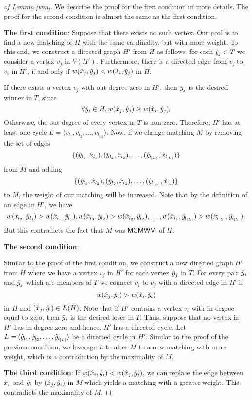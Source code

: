 \begin{proof}[of Lemma \ref{wm}] We describe the proof for the first condition in more details. The proof for the second condition is almost the same as the first condition. 

\textbf{The first condition}: Suppose that there exists no such vertex. Our goal is to find a new matching of $H$ with the same cardinality, but with more weight. To this end, we construct a directed graph $H'$ from $H$ as follows: for each $\hat{y}_j \in T$ we consider a vertex $v_j$ in $V(H')$. Furthermore, there is a directed edge from $v_j$ to $v_i$ in $H'$, if and only if $w(\hat{x}_j,\hat{y}_{j}) < w(\hat{x}_i,\hat{y}_j)$ in $H$. 

If there exists a vertex $v_j$ with out-degree zero in $H'$, then $\hat{y}_j$ is the desired winner in $T$, since
$$ \forall \hat{y}_i \in H, w(\hat{x}_j,\hat{y}_{j}) \geq w(\hat{x}_i,\hat{y}_j).$$
 Otherwise, the out-degree of every vertex in $T$ is non-zero. Therefore, $H'$ has at least one cycle $L = \langle v_{l_1}, v_{l_2}, \ldots, v_{l_{|L|}}\rangle$. Now, if we change matching $M$ by removing the set of edges $$ \{(\hat{y}_{l_1},\hat{x}_{l_1}), (\hat{y}_{l_2},\hat{x}_{l_2}), \ldots, (\hat{y}_{l_{|L|}},\hat{x}_{l_{|L|}})\} $$
from $M$ and adding 
$$\{(\hat{y}_{l_1},\hat{x}_{l_2}), (\hat{y}_{l_2},\hat{x}_{l_3}),\ldots,(\hat{y}_{l_{|L|}},\hat{x}_{l_1})\}$$ 
to $M$, the weight of our matching will be increased. Note that by the definition of an edge in $H'$, we have $$w(\hat{x}_{l_2}, \hat{y}_{l_1}) > w(\hat{x}_{l_1}, \hat{y}_{l_1}),w(\hat{x}_{l_3}, \hat{y}_{l_2}) > w(\hat{x}_{l_2}, \hat{y}_{l_2}),\ldots,w(\hat{x}_{l_1}, \hat{y}_{l_{|L|}}) > w(\hat{x}_{l_{|L|}}, \hat{y}_{l_{|L|}}).$$ But this contradicts the fact that  $M$ was $\textsf{MCMWM}$ of $H$.


\textbf{The second condition}:
\begin{comment}
The proof of this part is very similar to the proof of the first condition. For the sake of contradiction suppose that for every vertex $\vtwo_j \in T$, there is at least one vertex $\vtwo_i \in T$ where $w(\vone_j,\vtwo_{i}) > w(\vone_i,\vtwo_i)$ in $H$ with $(\vone_j,\vtwo_i) \in E(H)$.
\end{comment}
Similar to the proof of the first condition, we construct a new directed graph $H'$ from $H$ where we have a vertex $v_j$ in $H'$ for each vertex $\hat{y}_j$ in $T$. For every pair $\hat{y}_i$ and $\hat{y}_j$ which are members of $T$ we connect $v_i$ to $v_j$ with a directed edge in $H'$ if 
$$w(\hat{x}_j,\hat{y}_{i}) > w(\hat{x}_i,\hat{y}_i)$$ in $H$ and $(\hat{x}_j,\hat{y}_i) \in E(H)$. Note that if $H'$ contains a vertex $v_i$ with in-degree equal to zero, then $\hat{y}_i$ is the desired loser in $T$. Thus, suppose that no vertex in $H'$ has in-degree zero and hence, $H'$ has a directed cycle.  Let $L = \langle \hat{y}_{l_1}, \hat{y}_{l_2}, \ldots, \hat{y}_{l_{|L|}}\rangle$ be a directed cycle in $H'$. Similar to the proof of the previous condition, we leverage $L$ to alter $M$ to a new matching with more weight, which is a contradiction by the maximality of $M$.  

\textbf{The third condition}: If $w(\hat{x}_i,\hat{y}_i) < w(\hat{x}_j,\hat{y}_i)$, we can replace the edge between $\hat{x}_i$ and $\hat{y}_i$ by $(\hat{x}_j, \hat{y}_i)$ in $M$ which yields a matching with a greater weight. This contradicts the maximality of $M$.
\end{proof}
